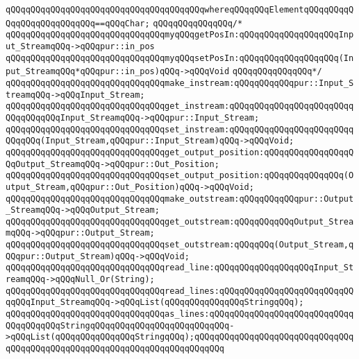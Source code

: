 \verb|qQQqqQQqqQQqqQQqqQQqqQQqqQQqqQQqqQQqqQQqwhereqQQqqQQqElementqQQqqQQqqQQqqQQqqQQqqQQqqQQq==qQQqChar;|\newline
\newline
\verb|qQQqqQQqqQQqqQQq/*|\newline
\verb|qQQqqQQqqQQqqQQqqQQqqQQqqQQqqQQqmyqQQqgetPosIn:qQQqqQQqqQQqqQQqqQQqInput_StreamqQQq->qQQqpur::in_pos|\newline
\verb|qQQqqQQqqQQqqQQqqQQqqQQqqQQqqQQqmyqQQqsetPosIn:qQQqqQQqqQQqqQQqqQQq(Input_StreamqQQq*qQQqpur::in_pos)qQQq->qQQqVoid|\newline
\verb|qQQqqQQqqQQqqQQq*/|\newline
\verb|qQQqqQQqqQQqqQQqqQQqqQQqqQQqqQQqmake_instream:qQQqqQQqqQQqpur::Input_StreamqQQq->qQQqInput_Stream;|\newline
\verb|qQQqqQQqqQQqqQQqqQQqqQQqqQQqqQQqget_instream:qQQqqQQqqQQqqQQqqQQqqQQqqQQqqQQqqQQqInput_StreamqQQq->qQQqpur::Input_Stream;|\newline
\verb|qQQqqQQqqQQqqQQqqQQqqQQqqQQqqQQqset_instream:qQQqqQQqqQQqqQQqqQQqqQQqqQQqqQQq(Input_Stream,qQQqpur::Input_Stream)qQQq->qQQqVoid;|\newline
\newline
\verb|qQQqqQQqqQQqqQQqqQQqqQQqqQQqqQQqget_output_position:qQQqqQQqqQQqqQQqqQQqOutput_StreamqQQq->qQQqpur::Out_Position;|\newline
\verb|qQQqqQQqqQQqqQQqqQQqqQQqqQQqqQQqset_output_position:qQQqqQQqqQQqqQQq(Output_Stream,qQQqpur::Out_Position)qQQq->qQQqVoid;|\newline
\newline
\verb|qQQqqQQqqQQqqQQqqQQqqQQqqQQqqQQqmake_outstream:qQQqqQQqqQQqpur::Output_StreamqQQq->qQQqOutput_Stream;|\newline
\newline
\verb|qQQqqQQqqQQqqQQqqQQqqQQqqQQqqQQqget_outstream:qQQqqQQqqQQqOutput_StreamqQQq->qQQqpur::Output_Stream;|\newline
\verb|qQQqqQQqqQQqqQQqqQQqqQQqqQQqqQQqset_outstream:qQQqqQQq(Output_Stream,qQQqpur::Output_Stream)qQQq->qQQqVoid;|\newline
\newline
\verb|qQQqqQQqqQQqqQQqqQQqqQQqqQQqqQQqread_line:qQQqqQQqqQQqqQQqqQQqInput_StreamqQQq->qQQqNull_Or(String);|\newline
\verb|qQQqqQQqqQQqqQQqqQQqqQQqqQQqqQQqread_lines:qQQqqQQqqQQqqQQqqQQqqQQqqQQqqQQqInput_StreamqQQq->qQQqList(qQQqqQQqqQQqqQQqStringqQQq);|\newline
\verb|qQQqqQQqqQQqqQQqqQQqqQQqqQQqqQQqas_lines:qQQqqQQqqQQqqQQqqQQqqQQqqQQqqQQqqQQqqQQqStringqQQqqQQqqQQqqQQqqQQqqQQqqQQq->qQQqList(qQQqqQQqqQQqqQQqStringqQQq);qQQqqQQqqQQqqQQqqQQqqQQqqQQqqQQqqQQqqQQqqQQqqQQqqQQqqQQqqQQqqQQqqQQqqQQqqQQq|\newline
